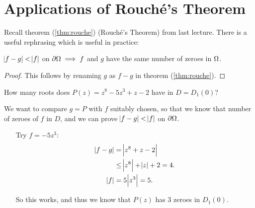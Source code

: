 \setcounter{section}{0}
\setcounter{theorem}{0}


\section{Applications of Rouché's Theorem}


Recall theorem (\ref{thm:rouche}) (Rouché's Theorem) from last lecture. There is a useful rephrasing which is useful in practice:


\begin{corollary}\label{thm:rouche2}
$\abs{f-g} < \abs{f}$ on $\partial \Omega \implies f$ and $g$ have the same number of zeroes in $\Omega$. 
\end{corollary}

\begin{proof}

This follows by renaming $g$ as $f-g$ in theorem (\ref{thm:rouche}).

\end{proof}

\begin{example}
How many roots does $P(z) = z^8-5z^3+z-2$ have in $D=D_1(0)$?

We want to compare $g=P$ with $f$ suitably chosen, so that we know that number of zeroes of $f$ in $D$, and we can prove $\abs{f-g} < \abs{f}$ on $\partial \Omega$.


\begin{enumerate}
    \item[Try] $f=-5z^3$:
    \begin{align*}
        \abs{f-g} &= \abs{z^8+z-2}\\
        &\leq \abs{z^8} + \abs{z} +2 = 4.\\
        \abs{f} &= 5\abs{z^3} = 5.
    \end{align*}
    
    So this works, and thus we know that $P(z)$ has $3$ zeroes in $D_1(0)$.
    
\end{enumerate}


\end{example}



